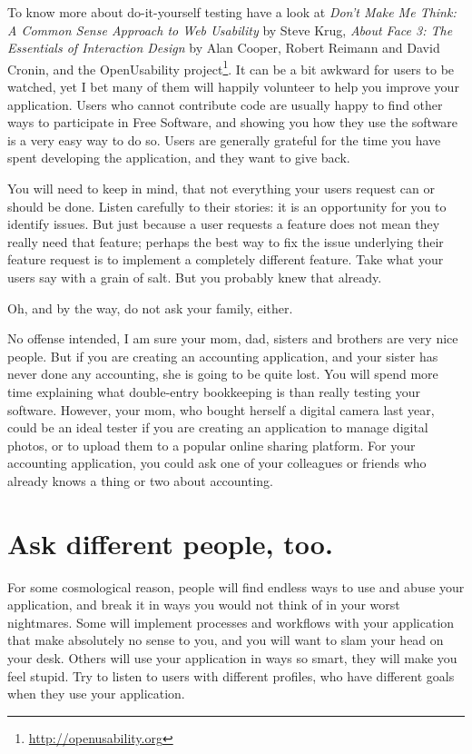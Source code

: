 To know more about
do-it-yourself testing have a look at \textit{Don't Make Me Think: A Common
Sense Approach to Web Usability} by Steve Krug, \textit{About Face 3: The
Essentials of Interaction Design} by Alan Cooper, Robert Reimann and David
Cronin, and the OpenUsability project\footnote{\url{http://openusability.org}}.
It can be a bit awkward for users to be watched, yet I bet many of them will
happily volunteer to help you improve your application. Users who cannot
contribute code are usually happy to find other ways to participate in Free Software, and showing
you how they use the software is a very easy way to do so. Users are generally
grateful for the time you have spent developing the application, and they want
to give back.

You will need to keep in mind, that not everything your users request
can or should be done. Listen carefully to their stories: it is an opportunity
for you to identify issues. But just because a user requests a feature does not mean
they really need that feature; perhaps the best way to fix the issue underlying
their feature request is to implement a completely different feature. Take what
your users say with a grain of salt. But you probably knew that already. 

Oh, and by the way, do not ask your family, either.

No offense intended, I am sure your mom, dad, sisters and brothers are very nice people.
But if you are creating an accounting application, and your sister has never done any accounting,
she is going to be quite lost. You will spend more time explaining what double-entry bookkeeping is
 than really testing your software. However, your mom, who bought herself a digital camera last year,
could be an ideal tester if you are creating an application to manage digital photos, or to upload
them to a popular online sharing platform. For your accounting application, you could ask one of
your colleagues or friends who already knows a thing or two about accounting.

\section*{Ask different people, too.}

For some cosmological reason, people will find endless ways to use and abuse
your application, and break it in ways you would not think of in your worst
nightmares. Some will implement processes and workflows with your application
that make absolutely no sense to you, and you will want to slam your head on
your desk. Others will use your application in ways so smart, they will make you
feel stupid. Try to listen to users with different profiles, who have different
goals when they use your application.

